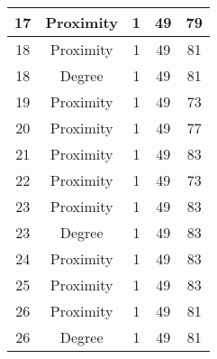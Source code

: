 \documentclass[results.tex]{subfiles}
\begin{document}
\begin{center}
\begin{tabular}{| c || c | c | c | c |}
            \hline
            17                      & Proximity                    & 1                      & 49                      & 79                   \\
            \hline
            18                      & Proximity                    & 1                      & 49                      & 81                   \\
            \hline
            18                      & Degree                       & 1                      & 49                      & 81                   \\
            \hline
            19                      & Proximity                    & 1                      & 49                      & 73                   \\
            \hline
            20                      & Proximity                    & 1                      & 49                      & 77                   \\
            \hline
            21                      & Proximity                    & 1                      & 49                      & 83                   \\
            \hline
            22                      & Proximity                    & 1                      & 49                      & 73                   \\
            \hline
            23                      & Proximity                    & 1                      & 49                      & 83                   \\
            \hline
            23                      & Degree                       & 1                      & 49                      & 83                   \\
            \hline
            24                      & Proximity                    & 1                      & 49                      & 83                   \\
            \hline
            25                      & Proximity                    & 1                      & 49                      & 83                   \\
            \hline
            26                      & Proximity                    & 1                      & 49                      & 81                   \\
            \hline
            26                      & Degree                       & 1                      & 49                      & 81                   \\

\end{tabular}
\end{center}
\end{document}
